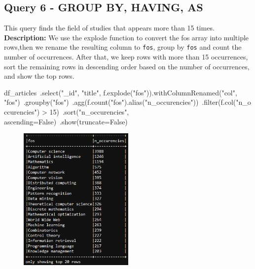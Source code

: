 \documentclass{Configuration_Files/PoliMi3i_thesis}
\begin{document}
\subsection{Query 6 - GROUP BY, HAVING, AS}
This query finds the field of studies that appears more than 15 times.\newline
\textbf{Description:} We use the explode function to convert the fos array into multiple rows,then we rename the resulting column to
\verb |fos|, group by \verb|fos| and count the number of occurrences.\newline
After that, we keep rows with more than 15 occurrences, sort the remaining rows in descending order based on the number of occurrences,
and show the top rows.\newline
\begin{python}
df_articles\
    .select("_id", "title", f.explode("fos")).withColumnRenamed("col", "fos")\
    .groupby("fos")\
    .agg(f.count("fos").alias("n_occurencies"))\
    .filter(f.col("n_occurencies") > 15)\
    .sort("n_occurencies", ascending=False)\
    .show(truncate=False)
\end{python}
\begin{figure}[H]
\centering
\includegraphics[width=0.5\textwidth]{query/spark_q6.PNG}
\label{fig:query6}
\end{figure}
\end{document}
